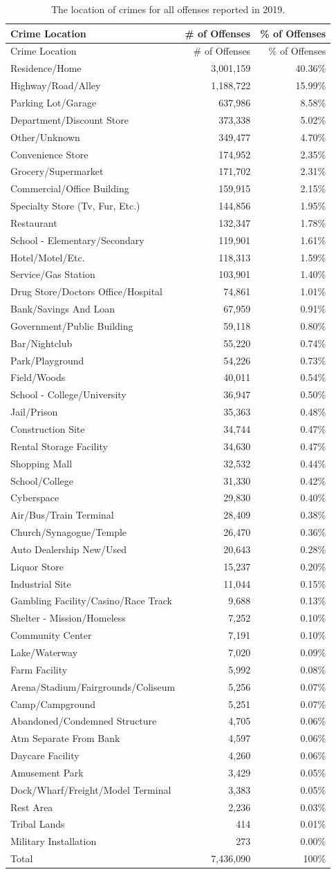 \documentclass[
  12pt,
  openany]{book}
\begin{document}
\begin{longtable}[]{@{}lrr@{}}
\caption{\label{tab:offenseLocation}The location of crimes for all offenses reported in 2019.}\tabularnewline
\toprule
Crime Location & \# of Offenses & \% of Offenses\tabularnewline
\midrule
\endfirsthead
\toprule
Crime Location & \# of Offenses & \% of Offenses\tabularnewline
\midrule
\endhead
Residence/Home & 3,001,159 & 40.36\%\tabularnewline
Highway/Road/Alley & 1,188,722 & 15.99\%\tabularnewline
Parking Lot/Garage & 637,986 & 8.58\%\tabularnewline
Department/Discount Store & 373,338 & 5.02\%\tabularnewline
Other/Unknown & 349,477 & 4.70\%\tabularnewline
Convenience Store & 174,952 & 2.35\%\tabularnewline
Grocery/Supermarket & 171,702 & 2.31\%\tabularnewline
Commercial/Office Building & 159,915 & 2.15\%\tabularnewline
Specialty Store (Tv, Fur, Etc.) & 144,856 & 1.95\%\tabularnewline
Restaurant & 132,347 & 1.78\%\tabularnewline
School - Elementary/Secondary & 119,901 & 1.61\%\tabularnewline
Hotel/Motel/Etc. & 118,313 & 1.59\%\tabularnewline
Service/Gas Station & 103,901 & 1.40\%\tabularnewline
Drug Store/Doctors Office/Hospital & 74,861 & 1.01\%\tabularnewline
Bank/Savings And Loan & 67,959 & 0.91\%\tabularnewline
Government/Public Building & 59,118 & 0.80\%\tabularnewline
Bar/Nightclub & 55,220 & 0.74\%\tabularnewline
Park/Playground & 54,226 & 0.73\%\tabularnewline
Field/Woods & 40,011 & 0.54\%\tabularnewline
School - College/University & 36,947 & 0.50\%\tabularnewline
Jail/Prison & 35,363 & 0.48\%\tabularnewline
Construction Site & 34,744 & 0.47\%\tabularnewline
Rental Storage Facility & 34,630 & 0.47\%\tabularnewline
Shopping Mall & 32,532 & 0.44\%\tabularnewline
School/College & 31,330 & 0.42\%\tabularnewline
Cyberspace & 29,830 & 0.40\%\tabularnewline
Air/Bus/Train Terminal & 28,409 & 0.38\%\tabularnewline
Church/Synagogue/Temple & 26,470 & 0.36\%\tabularnewline
Auto Dealership New/Used & 20,643 & 0.28\%\tabularnewline
Liquor Store & 15,237 & 0.20\%\tabularnewline
Industrial Site & 11,044 & 0.15\%\tabularnewline
Gambling Facility/Casino/Race Track & 9,688 & 0.13\%\tabularnewline
Shelter - Mission/Homeless & 7,252 & 0.10\%\tabularnewline
Community Center & 7,191 & 0.10\%\tabularnewline
Lake/Waterway & 7,020 & 0.09\%\tabularnewline
Farm Facility & 5,992 & 0.08\%\tabularnewline
Arena/Stadium/Fairgrounds/Coliseum & 5,256 & 0.07\%\tabularnewline
Camp/Campground & 5,251 & 0.07\%\tabularnewline
Abandoned/Condemned Structure & 4,705 & 0.06\%\tabularnewline
Atm Separate From Bank & 4,597 & 0.06\%\tabularnewline
Daycare Facility & 4,260 & 0.06\%\tabularnewline
Amusement Park & 3,429 & 0.05\%\tabularnewline
Dock/Wharf/Freight/Model Terminal & 3,383 & 0.05\%\tabularnewline
Rest Area & 2,236 & 0.03\%\tabularnewline
Tribal Lands & 414 & 0.01\%\tabularnewline
Military Installation & 273 & 0.00\%\tabularnewline
Total & 7,436,090 & 100\%\tabularnewline
\bottomrule
\end{longtable}
\end{document}
